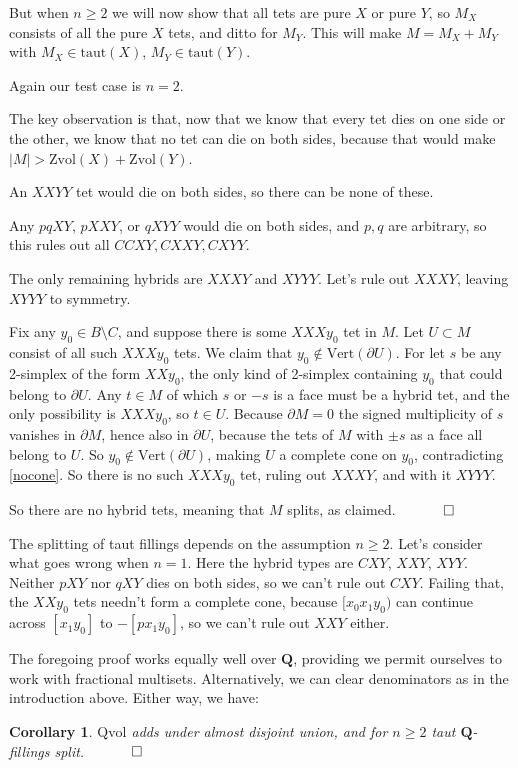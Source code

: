 \documentclass[12pt]{article}
\newtheorem{corollary}{Corollary}
\newcommand{\proofend}{$\quad \qed$}
\def\QQ{\mathbf{Q}}
\def\del{\partial}
\newcommand{\kw}{\mathrm}
\newcommand{\vertices}{\kw{Vert}}
\newcommand{\taut}{\kw{taut}}
\newcommand{\Zvol}{\kw{Zvol}}
\newcommand{\Qvol}{\kw{Qvol}}
\begin{document}
But when $n \geq 2$ we will now show that all tets are pure $X$ or pure $Y$,
so $M_X$ consists of all the pure $X$ tets, and ditto for $M_Y$.
This will make
$M = M_X + M_Y$ with $M_X \in \taut(X)$, $M_Y \in \taut(Y)$.

Again our test case is $n=2$.

The key observation is that, now that we know that every tet dies on
one side or the other, we know that no tet can die on both sides,
because that would make $|M| > \Zvol(X) + \Zvol(Y)$.

An $XXYY$ tet would die on both sides, so there can be none of these.

Any $pqXY$, $pXXY$, or $qXYY$ would die on both sides, and $p,q$ are arbitrary,
so this rules out all $CCXY,CXXY,CXYY$.

The only remaining hybrids are $XXXY$ and $XYYY$.
Let's rule out $XXXY$, leaving $XYYY$ to symmetry.

Fix any $y_0 \in B \setminus C$, and suppose there is
some $XXXy_0$ tet in $M$.
Let $U \subset M$ consist of all such $XXXy_0$ tets.
We claim that $y_0 \notin \vertices(\del U)$.
For let $s$ be any 2-simplex of the form $XXy_0$,
the only kind of 2-simplex containing $y_0$ that could belong
to $\del U$.
Any $t \in M$ of which $s$ or $-s$ is a face must be a hybrid tet,
and the only possibility is $XXXy_0$, so $t \in U$.
Because $\del M = 0$ the signed multiplicity of $s$
vanishes in $\del M$,
hence also in $\del U$,
because the tets of $M$ with $\pm s$ as a face all belong to $U$.
So $y_0 \notin \vertices(\del U)$,
making $U$ a complete cone on $y_0$,
contradicting \ref{nocone}.
So there is no such $XXXy_0$ tet, ruling out $XXXY$,
and with it $XYYY$.

So there are no hybrid tets, meaning that $M$ splits, as claimed.
\proofend

The splitting of taut fillings depends on the assumption $n\geq 2$.
Let's consider what goes wrong when $n=1$.
Here the hybrid types are $CXY$, $XXY$, $XYY$.
Neither $pXY$ nor $qXY$ dies on both sides, so we can't rule out $CXY$.
Failing that, the $XXy_0$ tets needn't form a complete cone,
because $[x_0x_1y_0)$ can continue across $[x_1 y_0]$ to $-[p x_1 y_0]$,
so we can't rule out $XXY$ either.

The foregoing proof works equally well over $\QQ$, providing we
permit ourselves to work with fractional multisets.
Alternatively, we can clear denominators as in the introduction
above.
Either way, we have:

\begin{corollary} \label{cor1}
$\Qvol$ adds under almost disjoint union,
and for $n \geq 2$
taut $\QQ$-fillings split.
\proofend
\end{corollary}
\end{document}
